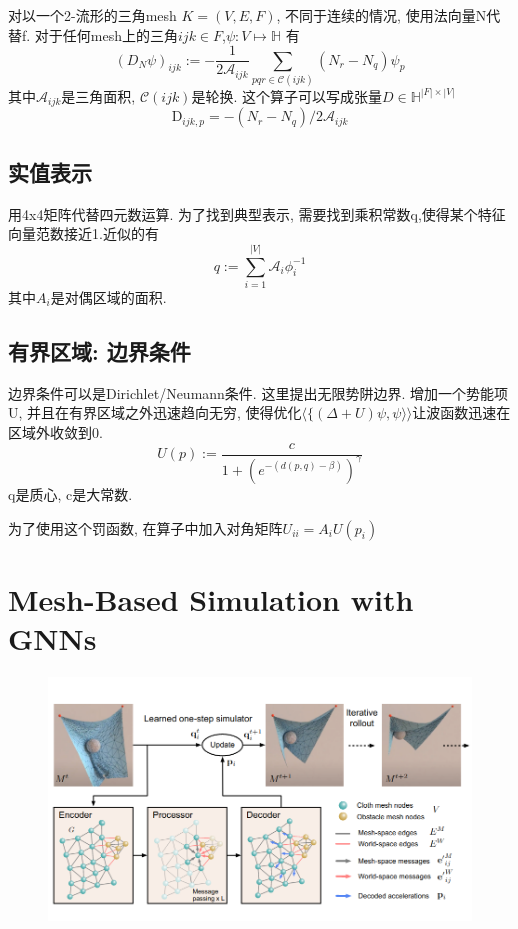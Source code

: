 \documentclass{article}
\begin{document}
对以一个2-流形的三角mesh $K=(V, E, F)$, 不同于连续的情况, 使用法向量N代替f. 对于任何mesh上的三角$ijk\in F$,$\psi:V\mapsto \mathbb H$ 有
\begin{equation}
    \left(D_{N} \psi\right)_{i j k}:=-\frac{1}{2 \mathcal{A}_{i j k}} \sum_{p q r \in \mathcal{C}(i j k)}\left(N_{r}-N_{q}\right) \psi_{p}
\end{equation}
其中$\mathcal A_{ijk}$是三角面积, $\mathcal C({ijk})$是轮换. 这个算子可以写成张量$D\in \mathbb H^{|F|\times |V|}$
\begin{equation}
    \mathrm{D}_{i j k, p}=-\left(N_{r}-N_{q}\right) / 2 \mathcal{A}_{i j k}
\end{equation}

\subsection{实值表示}
用4x4矩阵代替四元数运算. 为了找到典型表示, 需要找到乘积常数q,使得某个特征向量范数接近1.近似的有
\begin{equation}
    q:=\sum_{i=1}^{|V|} \mathcal{A}_{i} \phi_{i}^{-1}
\end{equation}
其中$A_i$是对偶区域的面积.

\subsection{有界区域: 边界条件}

边界条件可以是Dirichlet/Neumann条件. 这里提出无限势阱边界. 增加一个势能项U, 并且在有界区域之外迅速趋向无穷, 使得优化$\langle\{(\Delta+U) \psi, \psi\rangle\rangle$让波函数迅速在区域外收敛到0.
\begin{equation}
    U(p):=\frac{c}{1+\left(e^{-(d(p, q)-\beta)}\right)^{\gamma}}
\end{equation}
q是质心, c是大常数.

为了使用这个罚函数, 在算子中加入对角矩阵$U_{ii}=A_i U(p_i)$

\section{Mesh-Based Simulation with GNNs}
\begin{figure}[htbp]
    \centering
    \includegraphics[width=\textwidth]{meshsim.png}
\end{figure}
\end{document}
